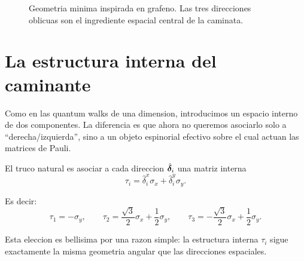 \begin{figure}[ht]
\centering
{}
\caption{Geometria minima inspirada en grafeno. Las tres direcciones oblicuas son el ingrediente espacial central de la caminata.}
\label{c03:fig:three-directions}
\end{figure}

\section{La estructura interna del caminante}

Como en las quantum walks de una dimension, introducimos un espacio interno de dos componentes. La diferencia es que ahora no queremos asociarlo solo a \enquote{derecha/izquierda}, sino a un objeto espinorial efectivo sobre el cual actuan las matrices de Pauli.

El truco natural es asociar a cada direccion \(\hat{\bm{\delta}}_i\) una matriz interna
\begin{equation}
\tau_i = \hat{\delta}_i^x \sigma_x + \hat{\delta}_i^y \sigma_y.
\label{c03:eq:taui}
\end{equation}

Es decir:
\begin{equation}
\tau_1 = -\sigma_y,
\qquad
\tau_2 = \frac{\sqrt{3}}{2}\sigma_x + \frac{1}{2}\sigma_y,
\qquad
\tau_3 = -\frac{\sqrt{3}}{2}\sigma_x + \frac{1}{2}\sigma_y.
\label{c03:eq:taus}
\end{equation}

Esta eleccion es bellisima por una razon simple: la estructura interna \(\tau_i\) sigue exactamente la misma geometria angular que las direcciones espaciales.

